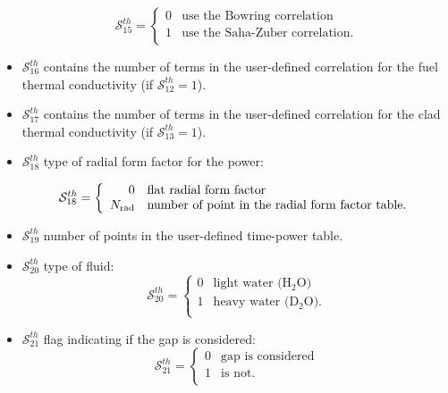 \begin{itemize}
\begin{displaymath} \mathcal{S}^{th}_{15} = \left\{
\begin{array}{rl}
 0 & \textrm{use the Bowring correlation} \\
 1 & \textrm{use the Saha-Zuber correlation.} \\
\end{array} \right.
\end{displaymath}

\item $\mathcal{S}^{th}_{16}$ contains the number of terms in the user-defined correlation for the fuel thermal conductivity (if $\mathcal{S}^{th}_{12}=1$).
\item $\mathcal{S}^{th}_{17}$ contains the number of terms in the user-defined correlation for the clad thermal conductivity (if $\mathcal{S}^{th}_{13}=1$).
\item $\mathcal{S}^{th}_{18}$ type of radial form factor for the power:

\begin{displaymath} \mathcal{S}^{th}_{18} = \left\{
\begin{array}{rl}
 0 & \textrm{flat radial form factor} \\
 N_{\rm rad} & \textrm{number of point in the radial form factor table.} \\
\end{array} \right.
\end{displaymath}

\item $\mathcal{S}^{th}_{19}$ number of points in the user-defined time-power table.

\item $\mathcal{S}^{th}_{20}$ type of fluid:
\begin{displaymath} \mathcal{S}^{th}_{20} = \left\{
\begin{array}{rl}
 0 & \textrm{light water (H$_2$O)} \\
 1 & \textrm{heavy water (D$_2$O).} \\
\end{array} \right.
\end{displaymath}

\item $\mathcal{S}^{th}_{21}$ flag indicating if the gap is considered:
\begin{displaymath} \mathcal{S}^{th}_{21} = \left\{
\begin{array}{rl}
 0 & \textrm{gap is considered} \\
 1 & \textrm{is not.} \\
\end{array} \right.
\end{displaymath}


\end{itemize}
